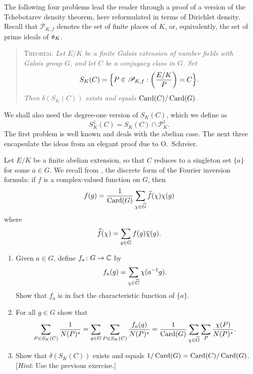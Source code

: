 \medskip
The following four problems lead the reader through a proof of a version of
the Tchebotarev density theorem, here reformulated in terms of Dirichlet
density. Recall that $\mathscr{P}_{K,f}$ denotes the set of finite places of
$K$, or, equivalently, the set of prime ideals of $\mathfrak{o}_K$.
\begin{quote}
  \textsc{Theorem.} \emph{Let $E/K$ be a finite Galois extension of number
  fields with Galois group $G$, and let $C$ be a conjugacy class in $G$. Set}
  \[
    S_K(C) = \Bigl\{P \in \mathscr{P}_{K,f} :
    \left(\frac{E/K}{P}\right) = C\Bigr\}.
  \]
  \emph{Then $\delta(S_K(C))$ exists and equals
  $\operatorname{Card}(C)/\operatorname{Card}(G)$.}
\end{quote}
We shall also need the degree-one version of $S_K(C)$, which we define as
\[
  S_K^1(C) = S_K(C) \cap \mathscr{P}_K^1.
\]
The first problem is well known and deals with the abelian case. The next
three encapsulate the ideas from an elegant proof due to O.~Schreier.

\begin{exercise}[18]
  \label{ex:ch7-18}
  Let $E/K$ be a finite abelian extension, so that $C$ reduces to a singleton
  set $\{a\}$ for some $a \in G$. We recall from
  , the discrete form of the Fourier inversion
  formula: if $f$ is a complex-valued function on $G$, then
  \[
    f(g) = \frac{1}{\operatorname{Card}(G)}
    \sum_{\chi \in \widehat{G}} \widehat{f}(\chi)\chi(g)
  \]
  where
  \[
    \widehat{f}(\chi) = \sum_{g \in G} f(g)\overline{\chi}(g).
  \]
  \begin{enumerate}[label=(\alph*)]
    \item Given $a \in G$, define $f_a \colon G \to \mathbb{C}$ by
      \[
        f_a(g) = \sum_{\chi \in \widehat{G}} \chi(a^{-1}g).
      \]
      Show that $f_a$ is in fact the characteristic function of $\{a\}$.
    \item For all $g \in G$ show that
      \[
        \sum_{P \in S_K(C)} \frac{1}{N(P)^s}
        = \sum_{g \in G} \sum_{P \in S_K(C)} \frac{f_a(g)}{N(P)^s}
        = \frac{1}{\operatorname{Card}(G)}
        \sum_{\chi \in \widehat{G}} \sum_P \frac{\chi(P)}{N(P)^s}.
      \]
    \item Show that $\delta(S_K(C))$ exists and equals
      $1/\operatorname{Card}(G) = \operatorname{Card}(C)/\operatorname{Card}(G)$.
      [\emph{Hint}: Use the previous exercise.]
  \end{enumerate}
\end{exercise}

